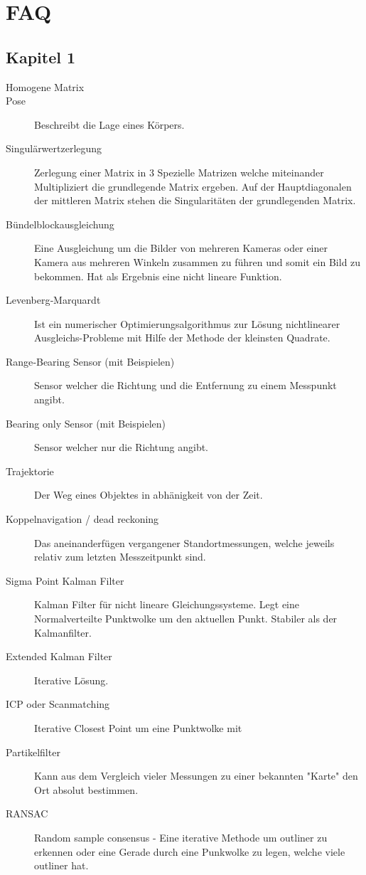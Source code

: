 \chapter{FAQ}
\label{cha:faq}

\section{Kapitel 1}
\label{sec:faq:kap1}
\begin{description}
	\item[Homogene Matrix]
 	\item[Pose] Beschreibt die Lage eines Körpers.
	\item[Singulärwertzerlegung] Zerlegung einer Matrix in 3 Spezielle Matrizen welche miteinander Multipliziert die grundlegende Matrix ergeben. Auf der Hauptdiagonalen der mittleren Matrix stehen die Singularitäten der grundlegenden Matrix. 
	\item[Bündelblockausgleichung] Eine Ausgleichung um die Bilder von mehreren Kameras oder einer Kamera aus mehreren Winkeln zusammen zu führen und somit ein Bild zu bekommen. Hat als Ergebnis eine nicht lineare Funktion.
	\item[Levenberg‐Marquardt] Ist ein numerischer Optimierungsalgorithmus zur Lösung nichtlinearer Ausgleichs-Probleme mit Hilfe der Methode der kleinsten Quadrate. 
	\item[Range‐Bearing Sensor (mit Beispielen)] Sensor welcher die Richtung und die Entfernung zu einem Messpunkt angibt.
	\item[Bearing only Sensor (mit Beispielen)] Sensor welcher nur die Richtung angibt.
	\item[Trajektorie] Der Weg eines Objektes in abhänigkeit von der Zeit.
	\item[Koppelnavigation / dead reckoning] Das aneinanderfügen vergangener Standortmessungen, welche jeweils relativ zum letzten Messzeitpunkt sind.
	\item[Sigma Point Kalman Filter] Kalman Filter für nicht lineare Gleichungssysteme. Legt eine Normalverteilte Punktwolke um den aktuellen Punkt. Stabiler als der Kalmanfilter.
	\item[Extended Kalman Filter] Iterative Lösung.
	\item[ICP oder Scanmatching] Iterative Closest Point um eine Punktwolke mit 
	\item[Partikelfilter] Kann aus dem Vergleich vieler Messungen zu einer bekannten "Karte" den Ort absolut bestimmen.
	\item[RANSAC]Random sample consensus - Eine iterative Methode um outliner zu erkennen oder eine Gerade durch eine Punkwolke zu legen, welche viele outliner hat.

\end{description}
